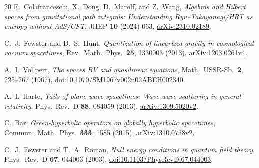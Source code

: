 \documentclass[10pt,a4paper]{article}
\numberwithin{equation}{section}
\begin{document}
\begin{thebibliography}{20}
E.~Colafranceschi, X.~Dong, D.~Marolf, and Z.~Wang,
\emph{Algebras and Hilbert spaces from gravitational path integrals: Understanding Ryu--Takayanagi/HRT as entropy without AdS/CFT},
JHEP \textbf{10} (2024) 063,
\href{https://arxiv.org/abs/2310.02189}{arXiv:2310.02189}.

C.~J.~Fewster and D.~S.~Hunt,
\emph{Quantization of linearized gravity in cosmological vacuum spacetimes},
Rev.\ Math.\ Phys.\ \textbf{25}, 1330003 (2013),
\href{https://arxiv.org/abs/1203.0261v4}{arXiv:1203.0261v4}.

A.~I.~Vol'pert,
\emph{The spaces BV and quasilinear equations},
Math.\ USSR-Sb.\ \textbf{2}, 225--267 (1967),
\href{https://doi.org/10.1070/SM1967v002n02ABEH002340}{doi:10.1070/SM1967v002n02ABEH002340}.

A.~I.~Harte,
\emph{Tails of plane wave spacetimes: Wave-wave scattering in general relativity},
Phys.\ Rev.\ D \textbf{88}, 084059 (2013),
\href{https://arxiv.org/abs/1309.5020v2}{arXiv:1309.5020v2}.

C.~B\"ar,
\emph{Green-hyperbolic operators on globally hyperbolic spacetimes},
Commun.\ Math.\ Phys.\ \textbf{333}, 1585 (2015),
\href{https://arxiv.org/abs/1310.0738v2}{arXiv:1310.0738v2}.

C.~J.~Fewster and T.~A.~Roman,
\emph{Null energy conditions in quantum field theory},
Phys.\ Rev.\ D \textbf{67}, 044003 (2003),
\href{https://doi.org/10.1103/PhysRevD.67.044003}{doi:10.1103/PhysRevD.67.044003}.

\end{thebibliography}
\endgroup
\end{document}
